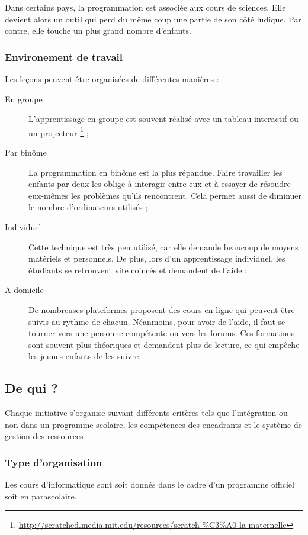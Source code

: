 Dans certains pays, la programmation est associée aux cours de sciences. Elle devient alors un outil qui perd du même coup une partie de son côté ludique. Par contre, elle touche un plus grand nombre d'enfants.\\

\subsubsection{Environement de travail}
\label{paire}
Les leçons peuvent être organisées de différentes manières :
\begin{description}
  \item[En groupe] L'apprentissage en groupe est souvent réalisé avec un tableau interactif ou un projecteur \footnote{\url{http://scratched.media.mit.edu/resources/scratch-\%C3\%A0-la-maternelle}} ;
  \item[Par binôme] La programmation en binôme est la plus répandue. Faire travailler les enfants par deux les oblige à interagir entre eux et à essayer de résoudre eux-mêmes les problèmes qu'ils rencontrent. Cela permet aussi de diminuer le nombre d'ordinateurs utilisés ;
  \item[Individuel] Cette technique est très peu utilisé, car elle demande beaucoup de moyens matériels et personnels. De plus, lors d'un apprentissage individuel, les étudiants se retrouvent vite coincés et demandent de l'aide ;
  \item[A domicile] De nombreuses plateformes proposent des cours en ligne qui peuvent être suivis au rythme de chacun. Néanmoins, pour avoir de l'aide, il faut se tourner vers une personne compétente ou vers les forums. Ces formations sont souvent plus théoriques et demandent plus de lecture, ce qui empêche les jeunes enfants de les suivre.
\end{description}

\subsection{De qui ?}
Chaque initiative s'organise suivant différents critères tels que l'intégration ou non dans un programme scolaire, les compétences des encadrants et le système de gestion des ressources

\subsubsection{Type d'organisation}
Les cours d'informatique sont soit donnés dans le cadre d'un programme officiel soit en parascolaire.

